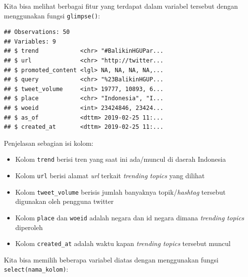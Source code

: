 \documentclass[]{tufte-handout}
\newenvironment{Shaded}{}{}
\newcommand{\KeywordTok}[1]{\textcolor[rgb]{0.00,0.44,0.13}{\textbf{#1}}}
\newcommand{\StringTok}[1]{\textcolor[rgb]{0.25,0.44,0.63}{#1}}
\newcommand{\CommentTok}[1]{\textcolor[rgb]{0.38,0.63,0.69}{\textit{#1}}}
\newcommand{\OperatorTok}[1]{\textcolor[rgb]{0.40,0.40,0.40}{#1}}
\newcommand{\NormalTok}[1]{#1}
\providecommand{\tightlist}{%
  \setlength{\itemsep}{0pt}\setlength{\parskip}{0pt}}
\begin{document}
Kita bisa melihat berbagai fitur yang terdapat dalam variabel tersebut
dengan menggunakan fungsi \texttt{glimpse()}:

\begin{Shaded}
\end{Shaded}

\begin{verbatim}
## Observations: 50
## Variables: 9
## $ trend            <chr> "#BalikinHGUPar...
## $ url              <chr> "http://twitter...
## $ promoted_content <lgl> NA, NA, NA, NA,...
## $ query            <chr> "%23BalikinHGUP...
## $ tweet_volume     <int> 19777, 10893, 6...
## $ place            <chr> "Indonesia", "I...
## $ woeid            <int> 23424846, 23424...
## $ as_of            <dttm> 2019-02-25 11:...
## $ created_at       <dttm> 2019-02-25 11:...
\end{verbatim}

Penjelasan sebagian isi kolom:

\begin{itemize}
\tightlist
\item
  Kolom \texttt{trend} berisi tren yang saat ini ada/muncul di daerah
  Indonesia
\item
  Kolom \texttt{url} berisi alamat \emph{url} terkait \emph{trending
  topics} yang dilihat
\item
  Kolom \texttt{tweet\_volume} berisis jumlah banyaknya
  topik/\emph{hashtag} tersebut digunakan oleh pengguna twitter
\item
  Kolom \texttt{place} dan \texttt{woeid} adalah negara dan id negara
  dimana \emph{trending topics} diperoleh
\item
  Kolom \texttt{created\_at} adalah waktu kapan \emph{trending topics}
  tersebut muncul
\end{itemize}

Kita bisa memilih beberapa variabel diatas dengan menggunakan fungsi
\texttt{select(nama\_kolom)}:

\begin{Shaded}
\end{Shaded}
\end{document}
